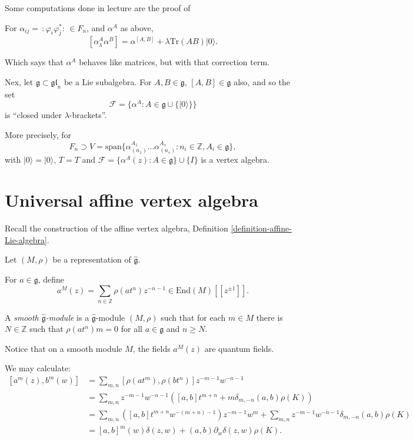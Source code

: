 Some computations done in lecture are the
proof of

\begin{theorem}
\label{theorem-alpha-is-like-matrices}
For $\alpha_{ij}=\,:\!\varphi_i
\varphi_j^*\!:\, \in F_n$,
and $\alpha^A$ as above,
$$
[\alpha^A_\lambda\alpha^B]=\alpha^{[A,B]}
+\lambda\text{Tr}(AB)|0\rangle.
$$
\end{theorem}

Which says that $\alpha^A$ behaves like
matrices,
but with that correction term.

\medskip\noindent
Nex, let $\mathfrak{g}\subset
\mathfrak{gl}_n$
be a Lie subalgebra.
For $A,B \in \mathfrak{g}$, $[A,B] \in
\mathfrak{g}$
also, and so the set
$$
\mathcal{F}=\{\alpha^A:A \in \mathfrak{g}
\cup \{|0\rangle\}\}
$$
is ``closed under $\lambda$-brackets''.

More precisely, for
$$
F_n \supset
V=\text{span}\{\alpha^{A_1}_{(n_1)}
\ldots\alpha^{A_s}_{(n_s)}:
n_i \in \mathbb{Z}, A_i \in \mathfrak{g}\},
$$
with $|0\rangle=|0\rangle$, $T=T$ and
$\mathcal{F}=\{\alpha^A(z):A \in
\mathfrak{g}\}\cup \{I\}$
is a vertex algebra.

\section{Universal affine vertex algebra}
\label{section-unive-affin-verte-algeb}

Recall the construction of the affine vertex
algebra,
Definition
\ref{definition-affine-Lie-algebra}.

Let $(M,\rho)$ be a representation of
$\hat{\mathfrak{g}}$.

For $a \in \mathfrak{g}$, define
\begin{equation}
\label{equation-quant-field-unive-verte}
a^M(z)=\sum_{n \in
\mathbb{Z}}\rho(at^n)z^{-n-1}
\in\text{End}(M)[\![z^{\pm 1}]\!].
\end{equation}
\begin{definition}
\label{definition-smooth-g-module}
A {\it smooth $\hat{\mathfrak{g}}$-module}
is a $\hat{\mathfrak{g}}$-module $(M,\rho)$
such that for each $m \in M$ there is $N \in
\mathbb{Z}$
such that $\rho(at^n)m=0$ for all
$a \in \mathfrak{g}$ and $n \geq N$.
\end{definition}

Notice that on a smooth module $M$,
the fields $a^M(z)$ are quantum fields.

We may calculate:
$$
\begin{aligned}
[a^m(z),b^m(w)]&=\sum_{m,n}[\rho(at^m),
\rho(bt^n)]z^{-m-1}w^{-n-1}\\
&=\sum_{m,n}z^{-m-1}w^{-n-1}
([a,b]t^{m+n}+m\delta_{m,-n}(a,b)\rho(K))\\
&=\sum_{m,n}([a,b]t^{m+n}w^{-(m+n)-1})z^{-m-
1}w^m
+\sum_{m,n}z^{-m-1}w^{-n-1}\delta_{m,-n}(a,b)
\rho(K)\\
&=[a,b]^m(w)\delta(z,w)
+(a,b)\partial_w\delta(z,w)\rho(K).
\end{aligned}
$$

